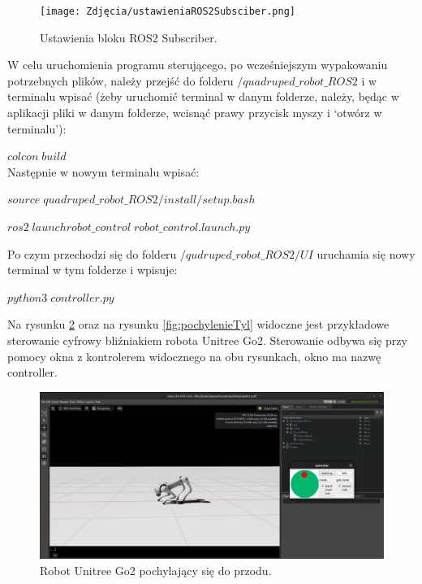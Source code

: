 \documentclass[12pt]{article}
\begin{document}
\begin{figure}[h]
    \centering
    \texttt{[image: Zdjęcia/ustawieniaROS2Subsciber.png]}
    \caption{Ustawienia bloku ROS2 Subscriber.}
    \label{fig:subscriberROS2}
\end{figure}



W celu uruchomienia programu sterującego, po wcześniejszym wypakowaniu potrzebnych plików,  należy przejść do folderu $/quadruped\_robot\_ROS2$ i w terminalu wpisać (żeby uruchomić terminal w danym folderze, należy, będąc w aplikacji pliki w danym folderze, wcisnąć prawy przycisk myszy i ‘otwórz w terminalu’):

\noindent $colcon\; build$\\

Następnie w nowym terminalu wpisać:


$source\; quadruped\_robot\_ROS2/install/setup.bash$

$ros2\; launch robot\_control\; robot\_control.launch.py$

\vspace{15px}

 Po czym przechodzi się do folderu $/qudruped\_robot\_ROS2/UI$ uruchamia się nowy terminal w tym folderze i wpisuje:

$python3\; controller.py$

\clearpage
 
Na rysunku \ref{fig:pochyleniePrzod} oraz na rysunku \ref{fig:pochylenieTyl} widoczne jest przykładowe sterowanie cyfrowy bliźniakiem robota Unitree Go2. Sterowanie odbywa się przy pomocy okna z kontrolerem widocznego na obu rysunkach, okno ma nazwę controller.



\begin{figure}[h]
    \centering
    \includegraphics[width=0.8\linewidth]{Zdjęcia/pochyleniePrzod.png}
    \caption{Robot Unitree Go2 pochylający się do przodu.}
    \label{fig:pochyleniePrzod}
\end{figure}
\end{document}
